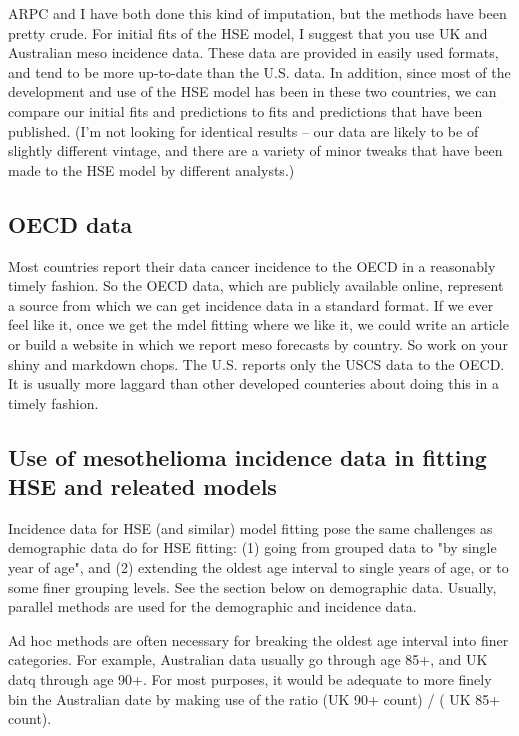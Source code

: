 \documentclass{article}\usepackage{graphicx, color}
\begin{document}
ARPC and I have both done this kind of imputation, but the methods have been pretty crude.  For initial fits of the HSE model, I suggest that you use UK and Australian meso incidence data.  These data are provided in easily used formats, and tend to be more up-to-date than the U.S. data.  In addition, since most of the development and use of the HSE model has been in these two countries, we can compare our initial fits and predictions to fits and predictions that have been published.  (I'm not looking for identical results -- our data are likely to be of slightly different vintage, and there are a variety of minor tweaks that have been made to the HSE model by different analysts.)

\subsection{OECD data}

Most countries report their data cancer incidence to the OECD in a reasonably timely fashion.  So the OECD data, which are publicly available online, represent a source from which we can get incidence data in a standard format.  If we ever feel like it, once we get the mdel fitting where we like it, we could write an article or build a website in which we report meso forecasts by country.  So work on your shiny and markdown chops. The U.S. reports only the USCS data to the OECD.  It is usually more laggard than other developed counteries about doing this in a timely fashion.

\subsection{Use of mesothelioma incidence data in fitting HSE and releated models}

Incidence data for HSE (and similar) model fitting pose the same challenges as demographic data do for HSE fitting: (1) going from grouped data to "by single year of age", and (2) extending the oldest age interval to single years of age, or to some finer grouping levels.  See the section below on demographic data.  Usually, parallel methods are used for the demographic and incidence data.

Ad hoc methods are often necessary for breaking the oldest age interval into finer categories.  For example, Australian data usually go through age 85+, and UK datq through age 90+.  For most purposes, it would be adequate to more finely bin the Australian date by making use of the ratio (UK 90+ count) / ( UK 85+ count).
\end{document}

